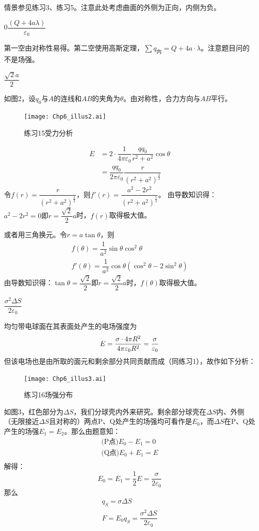 \documentclass[b5paper,opensource,sourcefont,parskip]{qyxf-book}
\begin{document}
\solve
情景参见练习3、练习5。注意此处考虑曲面的外侧为正向，内侧为负。

0\quad $\dfrac{(Q+4a\lambda)}{\varepsilon_0}$

\solve
第一空由对称性易得。第二空使用高斯定理，$\sum q_{\text{内}}=Q+4a\cdot\lambda$。注意题目问的不是场强。

$\dfrac{\sqrt{2}a}{2}$

\solve
如图2，设$q_0$与$A$的连线和$AB$的夹角为$\theta$。由对称性，合力方向与$AB$平行。
\begin{figure}[!htbp]
	\centering
	\texttt{[image: Chp6\_illus2.ai]}
	\caption{练习15\quad 受力分析}
\end{figure}
\begin{align*}
	E&=2\cdot \dfrac{1}{4\pi\varepsilon_0}\dfrac{qq_0}{r^2+a^2}\cos\theta\\
	&=\dfrac{qq_0}{2\pi\varepsilon_0}\dfrac{r}{{(r^2+a^2)}^{\frac{3}{2}}}
\end{align*}
令$f(r)=\dfrac{r}{{(r^2+a^2)}^{\frac{3}{2}}}$，则$f'(r)=\dfrac{a^2-2r^2}{{(r^2+a^2)}^{\frac{5}{2}}}$。
由导数知识得：$a^2-2r^2=0\text{即}r=\dfrac{\sqrt{2}}{2}a$时，$f(r)$取得极大值。

或者用三角换元。令$r=a\tan\theta$，则
\begin{gather*}
	f(\theta)=\dfrac{1}{a^2}\sin\theta\cos^2\theta\\
	f'(\theta)=\dfrac{1}{a^2}\cos\theta(\cos^2\theta-2\sin^2\theta)
\end{gather*}
由导数知识得：$\tan\theta=\dfrac{\sqrt{2}}{2}\text{即}r=\dfrac{\sqrt{2}}{2}a$时，$f(\theta)$取得极大值。

$\dfrac{\sigma^2\Delta S}{2\varepsilon_0}$

\solve
均匀带电球面在其表面处产生的电场强度为
\[
E=\dfrac{\sigma\cdot 4\pi R^2}{4\pi\varepsilon_0R^2}=\dfrac{\sigma}{\varepsilon_0}\\
\]
但该电场也是由所取的面元和剩余部分共同贡献而成（同练习1），故作如下分析：

\begin{figure}[!htbp]
	\centering
	\texttt{[image: Chp6\_illus3.ai]}
	\caption{练习16\quad 场强分布}
\end{figure}
如图3，红色部分为$\Delta S$，我们分球壳内外来研究。剩余部分球壳在$\Delta S$内、外侧（无限接近$\Delta S$且对称的）两点P、Q处产生的场强均可看作是$E_0$，而$\Delta S$在P、Q处产生的场强$E_1=E_2$。那么由题意知：
\begin{gather*}
	\text{(P点)}E_0-E_1=0\\
	\text{(Q点)}E_0+E_1=E\\
\end{gather*}
解得：
\[
E_0=E_1=\dfrac{1}{2}E=\dfrac{\sigma}{2\varepsilon_0}
\]
那么
\begin{gather*}
	q_S=\sigma\Delta S\\
	F=E_0q_S=\dfrac{\sigma^2\Delta S}{2\varepsilon_0}
\end{gather*}
\end{document}
